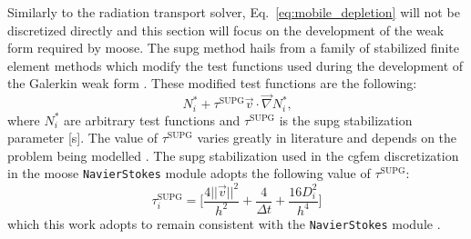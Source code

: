Similarly to the radiation transport solver, Eq.~\ref{eq:mobile_depletion} will not be discretized directly and this section will focus on the development of the weak form required by \acrshort{moose}. The \acrshort{supg} method hails from a family of stabilized finite element methods which modify the test functions used during the development of the Galerkin weak form \cite{ad_diff_supg}. These modified test functions are the following:
\begin{equation}\label{eq:supg_test}
    N^{*}_{i} + \tau^{\text{SUPG}}\vec{v}\cdot\vec{\nabla}N^{*}_{i}\text{,}
\end{equation}
where $N^{*}_{i}$ are arbitrary test functions and $\tau^{\text{SUPG}}$ is the \acrshort{supg} stabilization parameter [s]. The value of $\tau^{\text{SUPG}}$ varies greatly in literature and depends on the problem being modelled \cite{ad_diff_supg,ns_supg,moose_ns_cgfem}. The \acrshort{supg} stabilization used in the \acrshort{cgfem} discretization in the \acrshort{moose} \texttt{NavierStokes} module adopts the following value of $\tau^{\text{SUPG}}$:
\begin{equation}\label{eq:supg_stab}
    \tau^{\text{SUPG}}_{i} = \Bigg[\frac{4||\vec{v}||^{2}}{h^2} + \frac{4}{\Delta t} + \frac{16D_{i}^{2}}{h^4}\Bigg]
\end{equation}
which this work adopts to remain consistent with the \texttt{NavierStokes} module \cite{moose_ns_cgfem}.

